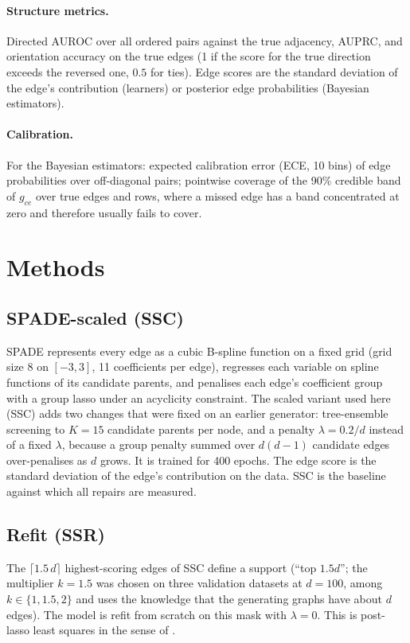 \documentclass[11pt,a4paper]{article}
\begin{document}
\paragraph{Structure metrics.} Directed AUROC over all ordered pairs against the true adjacency, AUPRC, and orientation accuracy on the true edges (1 if the score for the true direction exceeds the reversed one, $0.5$ for ties). Edge scores are the standard deviation of the edge's contribution (learners) or posterior edge probabilities (Bayesian estimators).

\paragraph{Calibration.} For the Bayesian estimators: expected calibration error (ECE, 10 bins) of edge probabilities over off-diagonal pairs; pointwise coverage of the 90\% credible band of $g_{ce}$ over true edges and rows, where a missed edge has a band concentrated at zero and therefore usually fails to cover.

\section{Methods}
\label{sec:methods}

\subsection{SPADE-scaled (SSC)}
SPADE \citep{dang_spade} represents every edge as a cubic B-spline function on a fixed grid (grid size 8 on $[-3,3]$, 11 coefficients per edge), regresses each variable on spline functions of its candidate parents, and penalises each edge's coefficient group with a group lasso under an acyclicity constraint. The scaled variant used here (SSC) adds two changes that were fixed on an earlier generator: tree-ensemble screening to $K=15$ candidate parents per node, and a penalty $\lambda=0.2/d$ instead of a fixed $\lambda$, because a group penalty summed over $d(d-1)$ candidate edges over-penalises as $d$ grows. It is trained for 400 epochs. The edge score is the standard deviation of the edge's contribution on the data. SSC is the baseline against which all repairs are measured.

\subsection{Refit (SSR)}
The $\lceil 1.5\,d\rceil$ highest-scoring edges of SSC define a support (``top $1.5d$''; the multiplier $k=1.5$ was chosen on three validation datasets at $d=100$, among $k\in\{1,1.5,2\}$ and uses the knowledge that the generating graphs have about $d$ edges). The model is refit from scratch on this mask with $\lambda=0$. This is post-lasso least squares in the sense of \citet{belloni2013}.
\end{document}
